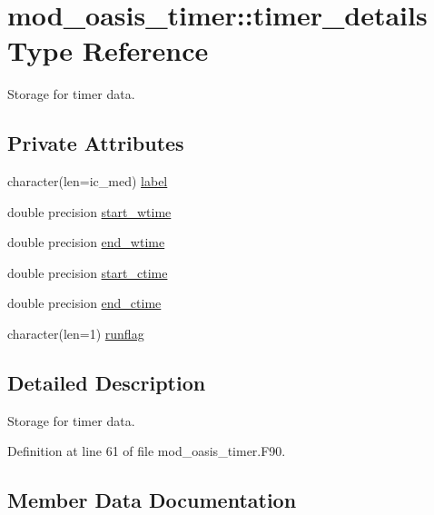 \hypertarget{structmod__oasis__timer_1_1timer__details}{}\section{mod\+\_\+oasis\+\_\+timer\+:\+:timer\+\_\+details Type Reference}
\label{structmod__oasis__timer_1_1timer__details}


Storage for timer data.  


\subsection*{Private Attributes}
\begin{DoxyCompactItemize}
\item 
character(len=ic\+\_\+med) \hyperlink{structmod__oasis__timer_1_1timer__details_a772c22856aef70d86030ba7aed99f85d}{label}
\item 
double precision \hyperlink{structmod__oasis__timer_1_1timer__details_a1b05dff81a75201d26ba232a265f70d0}{start\+\_\+wtime}
\item 
double precision \hyperlink{structmod__oasis__timer_1_1timer__details_af4ddda3c6547e993f367a5221671c50b}{end\+\_\+wtime}
\item 
double precision \hyperlink{structmod__oasis__timer_1_1timer__details_a2922806fc675af7b8aa9ab042bddfc24}{start\+\_\+ctime}
\item 
double precision \hyperlink{structmod__oasis__timer_1_1timer__details_a6203f13dc289b25e994b08b837636afc}{end\+\_\+ctime}
\item 
character(len=1) \hyperlink{structmod__oasis__timer_1_1timer__details_ac91fc6e6c7d8bca9c4519b506714384a}{runflag}
\end{DoxyCompactItemize}


\subsection{Detailed Description}
Storage for timer data. 

Definition at line 61 of file mod\+\_\+oasis\+\_\+timer.\+F90.



\subsection{Member Data Documentation}
\mbox{\label{structmod__oasis__timer_1_1timer__details_a6203f13dc289b25e994b08b837636afc}} 
